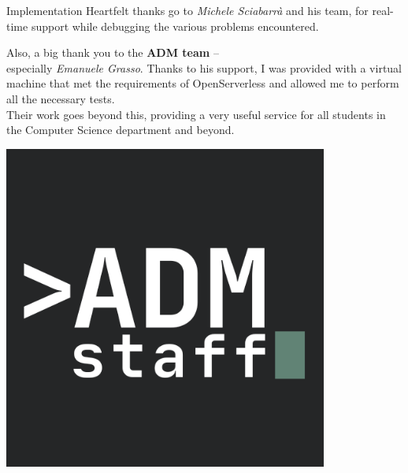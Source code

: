 \documentclass[aspectratio=169]{beamer}
\begin{document}
\begin{frame}{Implementation}
Heartfelt thanks go to \textit{Michele Sciabarrà} and his team, for real-time support while debugging the various problems encountered.\vspace{14pt}\\
\begin{minipage}{0.55\textwidth}
    Also, a big thank you to the \textbf{ADM team} – \\
    especially \textit{Emanuele Grasso}. Thanks to his support, I was provided with a virtual machine that met the requirements of OpenServerless and allowed me to perform all the necessary tests.\vspace{6pt}\\
    Their work goes beyond this, providing a very useful service for all students in the Computer Science department and beyond.
\end{minipage}
\hfill
\begin{minipage}{0.4\textwidth}
    \centering
    \includegraphics[width=0.8\textwidth]{img/adm_logo.png}
\end{minipage}
\end{frame}
\end{document}
